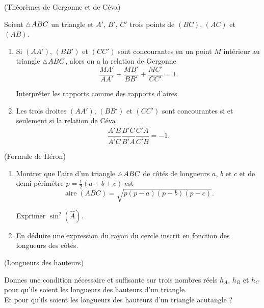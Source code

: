 \documentclass[a4paper,11pt,reqno]{amsart}
\DeclareMathOperator{\aire}{aire}
\begin{document}
\begin{exo} (Théorèmes de Gergonne et de Céva)

  Soient $\tri ABC$ un triangle et $A'$, $B'$, $C'$ trois points de $(BC)$, $(AC)$ et $(AB)$.
  \begin{enumerate}
    \item Si $(AA')$, $(BB')$ et $(CC')$ sont concourantes en un point $M$ intérieur au triangle $\tri ABC$, alors on a la relation de Gergonne
    $$
      \frac{MA'}{AA'}+\frac{MB'}{BB'}+\frac{MC'}{CC'}=1.
    $$
    \begin{indication}
      Interpréter les rapports comme des rapports d'aires.
    \end{indication}
    \item Les trois droites $(AA')$, $(BB')$ et $(CC')$ sont concourantes si et seulement si la relation de Céva
      $$
        \frac{\overline{A'B}}{\overline{A'C}}\frac{\overline{B'C}}{\overline{B'A}}\frac{\overline{C'A}}{\overline{C'B}}=-1.
      $$
  \end{enumerate}
\end{exo}

\begin{exo} (Formule de Héron)

  \begin{enumerate}
    \item Montrer que l'aire d'un triangle $\tri ABC$ de côtés de longueurs $a$, $b$ et $c$ et de demi-périmètre $p=\frac{1}{2}(a+b+c)$ est
    $$
      \aire{(ABC)}=\sqrt{p(p-a)(p-b)(p-c)}.
    $$
    \begin{indication}
      Exprimer $\sin^2(\widehat{A})$.
    \end{indication}
    \item En déduire une expression du rayon du cercle inscrit en fonction des longueurs des côtés.
  \end{enumerate}
\end{exo}

\begin{exo}[.7] (Longueurs des hauteurs)

  Donnes une condition nécessaire et suffisante sur trois nombres réels $h_{A}$, $h_{B}$ et $h_{C}$ pour qu'ils soient les longueurs des hauteurs d'un triangle.\\
  Et pour qu'ils soient les longueurs des hauteurs d'un triangle acutangle ?
\end{exo}
\end{document}
